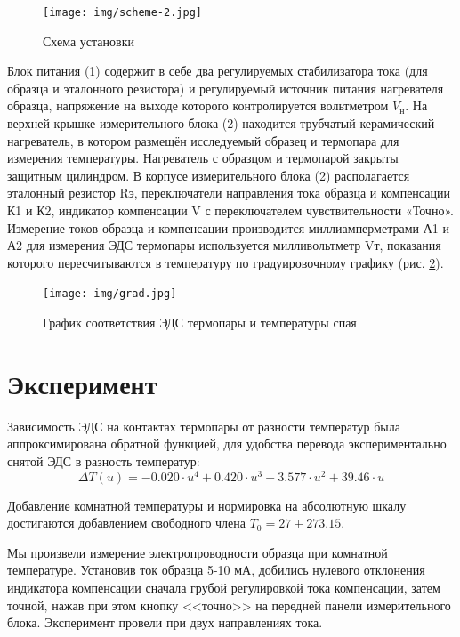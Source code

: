 \documentclass[a4paper,14pt]{extarticle}
\begin{document}
\begin{figure}[h!]
	\centering
	\texttt{[image: img/scheme-2.jpg]}
	\caption{Схема установки}
	\label{fig:6.2}
\end{figure}

Блок питания (1) содержит в себе два регулируемых стабилизатора тока (для образца и эталонного резистора) и регулируемый
источник питания нагревателя образца, напряжение на выходе которого контролируется вольтметром $V_\text{н}$. На верхней
крышке измерительного блока (2) находится трубчатый керамический нагреватель, в котором размещён исследуемый образец и
термопара для измерения температуры. Нагреватель с образцом и термопарой закрыты защитным цилиндром. В корпусе
измерительного блока (2) располагается эталонный резистор Rэ, переключатели направления тока образца и компенсации К1 и
К2, индикатор компенсации V с переключателем чувствительности «Точно». Измерение токов образца и компенсации
производится миллиамперметрами А1 и А2 для измерения ЭДС термопары используется милливольтметр Vт, показания которого
пересчитываются в температуру по градуировочному графику (рис. \ref{fig:6.3}).

\begin{figure}[h!]
	\centering
	\texttt{[image: img/grad.jpg]}
	\caption{График соответствия ЭДС термопары и температуры спая}
	\label{fig:6.3}
\end{figure}



\section{Эксперимент}

Зависимость ЭДС на контактах термопары от разности температур была аппроксимирована обратной функцией, для удобства перевода экспериментально снятой ЭДС в разность температур:
\begin{equation}
	\label{eq:app}
	\Delta T(u)=-0.020\cdot u^4+0.420\cdot u^3-3.577\cdot u^2+39.46\cdot u
\end{equation}

Добавление комнатной температуры и нормировка на абсолютную шкалу достигаются добавлением свободного члена $T_0=27+273.15$.

Мы произвели измерение электропроводности образца при комнатной температуре. Установив ток образца 5-10 мА, добились нулевого отклонения индикатора компенсации сначала грубой регулировкой тока компенсации, затем точной, нажав при этом кнопку <<точно>> на передней панели измерительного блока. Эксперимент провели при двух направлениях тока.
\end{document}
